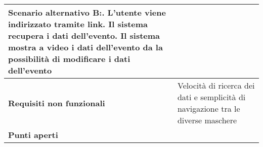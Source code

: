 \begin{tabular} {|P{4.5cm}|P{12.5cm}|}
  Scenario alternativo B:. L'utente viene indirizzato tramite link. Il sistema recupera i dati dell'evento. Il sistema mostra a video i dati dell'evento da la possibilità di modificare i dati dell'evento                                                                                                                                     \\
  \hline
  \textbf{Requisiti non funzionali} & Velocità di ricerca dei dati e
  semplicità di navigazione tra le diverse maschere                                                                                                                                                                                      \\
  \hline
  \textbf{Punti aperti}             &                                                                                                                                                                                                    \\
  \hline
\end{tabular}
\hfill
\break

